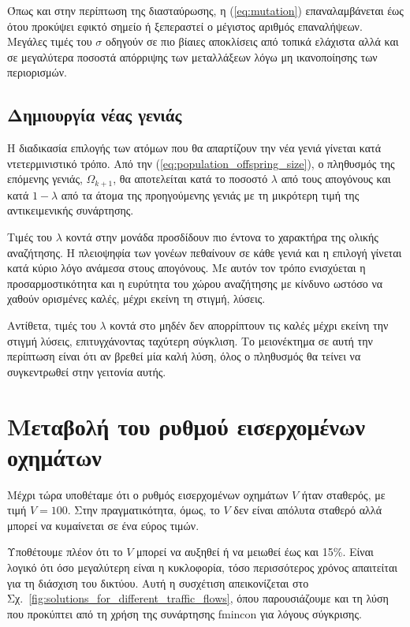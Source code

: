 \documentclass[a4paper,12pt]{article}
\begin{document}
Όπως και στην περίπτωση της διασταύρωσης, η (\ref{eq:mutation}) επαναλαμβάνεται έως ότου προκύψει εφικτό σημείο
ή ξεπεραστεί ο μέγιστος αριθμός επαναλήψεων. Μεγάλες τιμές του $\sigma$ οδηγούν σε πιο βίαιες αποκλίσεις από
τοπικά ελάχιστα αλλά και σε μεγαλύτερα ποσοστά απόρριψης των μεταλλάξεων λόγω μη ικανοποίησης των περιορισμών.

\subsection{Δημιουργία νέας γενιάς}
Η διαδικασία επιλογής των ατόμων που θα απαρτίζουν την νέα γενιά γίνεται κατά ντετερμινιστικό τρόπο. Από την
(\ref{eq:population_offspring_size}), ο πληθυσμός της επόμενης γενιάς, $\Omega_{k+1}$, θα αποτελείται κατά το
ποσοστό $\lambda$ από τους απογόνους και κατά $1 - \lambda$ από τα άτομα της προηγούμενης γενιάς με τη μικρότερη
τιμή της αντικειμενικής συνάρτησης.

Τιμές του $\lambda$ κοντά στην μονάδα προσδίδουν πιο έντονα το χαρακτήρα της ολικής αναζήτησης. Η πλειοψηφία των
γονέων πεθαίνουν σε κάθε γενιά και η επιλογή γίνεται κατά κύριο λόγο ανάμεσα στους απογόνους. Με αυτόν τον τρόπο 
ενισχύεται η προσαρμοστικότητα και η ευρύτητα του χώρου αναζήτησης με κίνδυνο ωστόσο να χαθούν ορισμένες καλές,
μέχρι εκείνη τη στιγμή, λύσεις.

Αντίθετα, τιμές του $\lambda$ κοντά στο μηδέν δεν απορρίπτουν τις καλές μέχρι εκείνη την στιγμή λύσεις,
επιτυγχάνοντας ταχύτερη σύγκλιση. Το μειονέκτημα σε αυτή την περίπτωση είναι ότι αν βρεθεί μία καλή λύση,
όλος ο πληθυσμός θα τείνει να συγκεντρωθεί στην γειτονία αυτής.

\section{Μεταβολή του ρυθμού εισερχομένων οχημάτων}

Μέχρι τώρα υποθέταμε ότι ο ρυθμός εισερχομένων οχημάτων $V$ ήταν σταθερός, με τιμή $V = 100$.  
Στην πραγματικότητα, όμως, το $V$ δεν είναι απόλυτα σταθερό αλλά μπορεί να κυμαίνεται σε ένα εύρος τιμών.  

Υποθέτουμε πλέον ότι το $V$ μπορεί να αυξηθεί ή να μειωθεί έως και 15\%.  
Είναι λογικό ότι όσο μεγαλύτερη είναι η κυκλοφορία, τόσο περισσότερος χρόνος απαιτείται  
για τη διάσχιση του δικτύου. Αυτή η συσχέτιση απεικονίζεται στο Σχ.~\ref{fig:solutions_for_different_traffic_flows},  
όπου παρουσιάζουμε και τη λύση που προκύπτει από τη χρήση της συνάρτησης 
fmincon για λόγους σύγκρισης.
\end{document}
